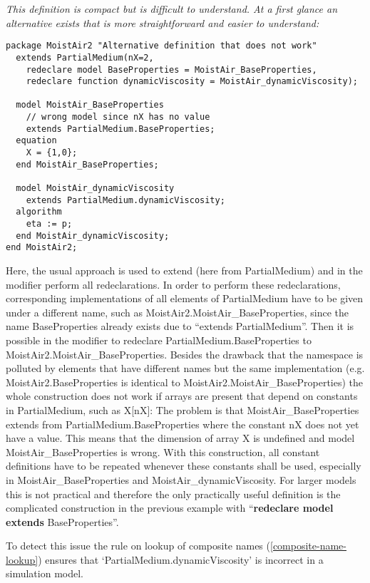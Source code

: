 \emph{This definition is compact but is difficult to understand. At a
first glance an alternative exists that is more straightforward and
easier to understand: }
\begin{lstlisting}[language=modelica]
package MoistAir2 "Alternative definition that does not work"
  extends PartialMedium(nX=2,
    redeclare model BaseProperties = MoistAir_BaseProperties,
    redeclare function dynamicViscosity = MoistAir_dynamicViscosity);

  model MoistAir_BaseProperties
    // wrong model since nX has no value
    extends PartialMedium.BaseProperties;
  equation
    X = {1,0};
  end MoistAir_BaseProperties;

  model MoistAir_dynamicViscosity
    extends PartialMedium.dynamicViscosity;
  algorithm
    eta := p;
  end MoistAir_dynamicViscosity;
end MoistAir2;
\end{lstlisting}

Here, the usual approach is used to extend (here from PartialMedium) and
in the modifier perform all redeclarations. In order to perform these
redeclarations, corresponding implementations of all elements of
PartialMedium have to be given under a different name, such as
MoistAir2.MoistAir\_BaseProperties, since the name BaseProperties
already exists due to ``extends PartialMedium''. Then it is possible in
the modifier to redeclare PartialMedium.BaseProperties to
MoistAir2.MoistAir\_BaseProperties. Besides the drawback that the
namespace is polluted by elements that have different names but the same
implementation (e.g. MoistAir2.BaseProperties is identical to
MoistAir2.MoistAir\_BaseProperties) the whole construction does not work
if arrays are present that depend on constants in PartialMedium, such as
  X{[}nX{]}: The problem is that MoistAir\_BaseProperties extends from
  PartialMedium.BaseProperties where the constant nX does not yet have a
  value. This means that the dimension of array X is undefined and model
  MoistAir\_BaseProperties is wrong. With this construction, all constant
definitions have to be repeated whenever these constants shall be used,
especially in MoistAir\_BaseProperties and MoistAir\_dynamicViscosity.
For larger models this is not practical and therefore the only
practically useful definition is the complicated construction in the
previous example with ``\textbf{redeclare model extends}
BaseProperties''.

To detect this issue the rule on lookup of composite names (\ref{composite-name-lookup})
ensures that `PartialMedium\allowbreak{}.dynamicViscosity' is incorrect in a
simulation model.

